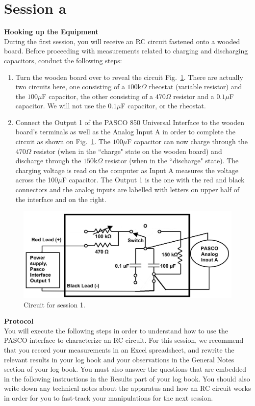 \documentclass[12pt]{report}
\begin{document}
\section{Session a}
\noindent \large \textbf{Hooking up the Equipment} \normalsize \\
During the first session, you will receive an RC circuit fastened onto a wooded board. 
Before proceeding with measurements related to charging and discharging capacitors, conduct the following steps:
\begin{enumerate}
\item Turn the wooden board over to reveal the circuit Fig.~\ref{Fig:lab2-session1-circuit1}. 
There are actually two circuits here, one consisting of a $100$k$\Omega$ rheostat (variable resistor) and the $100\mu$F capacitor, the other consisting of a $470\Omega$ resistor and a $0.1\mu$F capacitor. 
We will not use the $0.1 \mu$F capacitor, or the rheostat.
\item Connect the Output 1 of the PASCO 850 Universal Interface to the wooden board's terminals as well as the Analog Input A in order to complete the circuit as shown on Fig.~\ref{Fig:lab2-session1-circuit1}. 
The $100\mu$F capacitor can now charge through the $470\Omega$ resistor (when in the ``charge" state on the wooden board) and discharge through the $150$k$\Omega$ resistor (when in the ``discharge" state). 
The charging voltage is read on the computer as Input A measures the voltage across the 100$\mu$F capacitor. 
The Output 1 is the one with the red and black connectors and the analog inputs are labelled with letters on upper half of the interface and on the right.
\end{enumerate}

\begin{figure}[h]
\centering
\includegraphics[width=0.75\linewidth]{lab2-session1-circuit2}
\caption{Circuit for session 1.}
\label{Fig:lab2-session1-circuit1}
\end{figure}


\noindent \large \textbf{Protocol} \normalsize \\
You will execute the following steps in order to understand how to use the PASCO interface to characterize an RC circuit. 
For this session, we recommend that you {\color{blue} record your measurements in an Excel spreadsheet, and rewrite the relevant results in your log book and your observations in the General Notes section of your log book. You must also answer the questions that are embedded in the following instructions in the Results part of your log book. You should also write down any technical notes about the apparatus and how an RC circuit works in order for you to fast-track your manipulations for the next session.}
\end{document}
